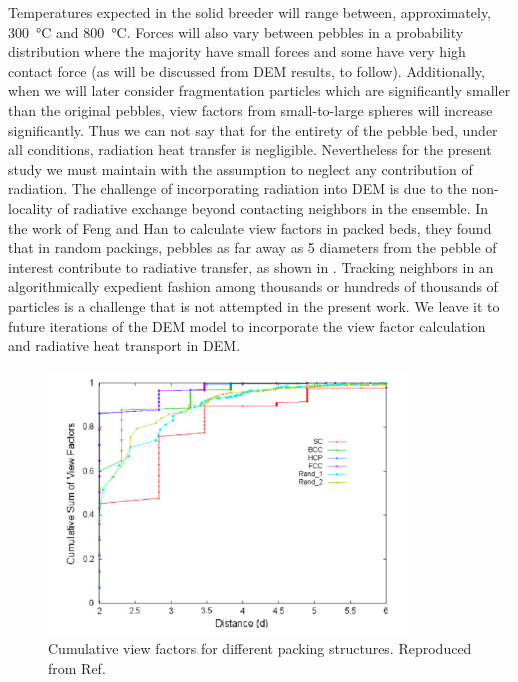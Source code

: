 Temperatures expected in the solid breeder will range between, approximately, \SI{300}{\celsius} and \SI{800}{\celsius}. Forces will also vary between pebbles in a probability distribution where the majority have small forces and some have very high contact force (as will be discussed from DEM results, to follow). Additionally, when we will later consider fragmentation particles which are significantly smaller than the original pebbles, view factors from small-to-large spheres will increase significantly. Thus we can not say that for the entirety of the pebble bed, under all conditions, radiation heat transfer is negligible. Nevertheless for the present study we must maintain with the assumption to neglect any contribution of radiation. The challenge of incorporating radiation into DEM is due to the non-locality of radiative exchange beyond contacting neighbors in the ensemble. In the work of Feng and Han to calculate view factors in packed beds, they found that in random packings, pebbles as far away as 5 diameters from the pebble of interest contribute to radiative transfer, as shown in .\cite{Feng2012} Tracking neighbors in an algorithmically expedient fashion among thousands or hundreds of thousands of particles is a challenge that is not attempted in the present work. We leave it to future iterations of the DEM model to incorporate the view factor calculation and radiative heat transport in DEM.
\begin{figure}[ht]
    \centering
    \includegraphics[width=0.85\textwidth]{figures/conduction-vs-radiation/cum-view-factors}
    \caption{Cumulative view factors for different packing structures. Reproduced from Ref.\cite{Feng2012}}
    \label{fig:packing-vf}
\end{figure}
